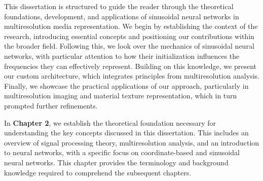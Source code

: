 
This dissertation is structured to guide the reader through the theoretical foundations, development, and applications of sinusoidal neural networks in multiresolution media representation. We begin by establishing the context of the research, introducing essential concepts and positioning our contributions within the broader field. Following this, we look over the mechanics of sinusoidal neural networks, with particular attention to how their initialization influences the frequencies they can effectively represent. Building on this knowledge, we present our custom architecture, which integrates principles from multiresolution analysis. Finally, we showcase the practical applications of our approach, particularly in multiresolution imaging and material texture representation, which in turn prompted further refinements.


In \textbf{Chapter 2}, we establish the theoretical foundation necessary for understanding the key concepts discussed in this dissertation. This includes an overview of signal processing theory, multiresolution analysis, and an introduction to neural networks, with a specific focus on coordinate-based and sinusoidal neural networks. This chapter provides the terminology and background knowledge required to comprehend the subsequent chapters.


